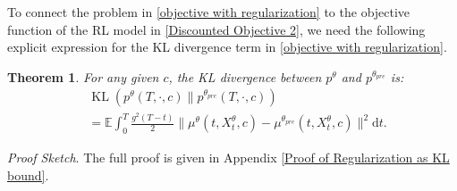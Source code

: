 \documentclass{article}
\theoremstyle{plain}
\newtheorem{theorem}{Theorem}[section]
\theoremstyle{definition}
\theoremstyle{remark}
\begin{document}
To connect the problem in \eqref{objective with regularization}
to the objective function of the RL model in \eqref{Discounted Objective 2}, we need the following explicit expression for the KL divergence term in \eqref{objective with regularization}.
\begin{theorem}
\label{thm:Regularization as KL bound}
For any given $c$, the KL divergence between $p^{\theta}$ and $p^{\theta_{pre}}$ is:
\begin{align}
&\operatorname{KL}(p^{\theta}(T,\cdot,c)\|p^{\theta_{pre}}(T,\cdot,c))\nonumber\\
&= \mathbb{E}\int_{0}^{T} \frac{g^2(T-t)}{2}\|\mu^{\theta}(t,X_t^{\theta},c)-\mu^{\theta_{pre}}(t,X_t^{\theta},c)\|^2\mathrm{d}t.
\end{align}
\end{theorem}
{\it Proof Sketch}. The full proof is given in Appendix \ref{Proof of Regularization as KL bound}. 
\end{document}
